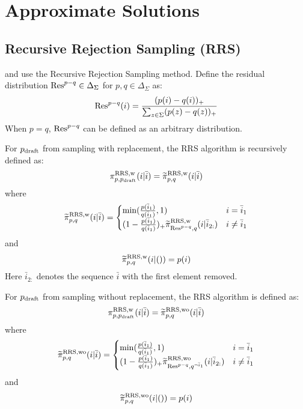 \documentclass{article}
\begin{document}
\newpage
\appendix
\section{Approximate Solutions}\label{se:approxverify}

\subsection{Recursive Rejection Sampling (RRS)}
\citet{yang2024multi} and \citet{jeon2024recursive} use the Recursive Rejection Sampling method. Define the residual distribution $\operatorname{Res}^{p-q}\in \Delta_\Sigma$ for $p,q\in \Delta_\Sigma$ as:
\begin{equation}
\operatorname{Res}^{p-q}(i)=\frac{(p(i)-q(i))_+}{\sum_{z\in\Sigma}(p(z)-q(z))_+}
\end{equation}
When $p=q$, $\operatorname{Res}^{p-q}$ can be defined as an arbitrary distribution.

For $p_{\operatorname{draft}}$ from sampling with replacement, the RRS algorithm is recursively defined as:
\begin{equation}
\pi^{\operatorname{RRS},\operatorname{w}}_{p,p_{\operatorname{draft}}}(i|\bar{i})=\widetilde{\pi}^{\operatorname{RRS},\operatorname{w}}_{p,q}(i|\bar{i})
\end{equation}
where
\begin{equation}
\widetilde{\pi}^{\operatorname{RRS},\operatorname{w}}_{p,q}(i|\bar{i})=
\begin{cases}\min(\frac{p(\bar{i}_1)}{q(\bar{i}_1)},1)&i=\bar{i}_1\\(1-\frac{p(\bar{i}_1)}{q(\bar{i}_1)})_+
\widetilde{\pi}^{\operatorname{RRS},\operatorname{w}}_{\operatorname{Res}^{p-q},q}(i|\bar{i}_{2:})
&i\neq \bar{i}_1\end{cases}
\end{equation}
and
\begin{equation}
\widetilde{\pi}^{\operatorname{RRS},\operatorname{w}}_{p,q}(i|())=p(i)
\end{equation}
Here $\bar{i}_{2:}$ denotes the sequence $\bar{i}$ with the first element removed.

For $p_{\operatorname{draft}}$ from sampling without replacement, the RRS algorithm is defined as:
\begin{equation}
\pi^{\operatorname{RRS},\operatorname{w}}_{p,p_{\operatorname{draft}}}(i|\bar{i})=\widetilde{\pi}^{\operatorname{RRS},\operatorname{wo}}_{p,q}(i|\bar{i})
\end{equation}
where
\begin{equation}
\widetilde{\pi}^{\operatorname{RRS},\operatorname{wo}}_{p,q}(i|\bar{i})=
\begin{cases}\min(\frac{p(\bar{i}_1)}{q(\bar{i}_1)},1)&i=\bar{i}_1\\(1-\frac{p(\bar{i}_1)}{q(\bar{i}_1)})_+
\widetilde{\pi}^{\operatorname{RRS},\operatorname{wo}}_{\operatorname{Res}^{p-q},q^{\neg \bar{i}_1}}(i|\bar{i}_{2:})
&i\neq \bar{i}_1\end{cases}
\end{equation}
and
\begin{equation}
\widetilde{\pi}^{\operatorname{RRS},\operatorname{wo}}_{p,q}(i|())=p(i)
\end{equation}
\end{document}
